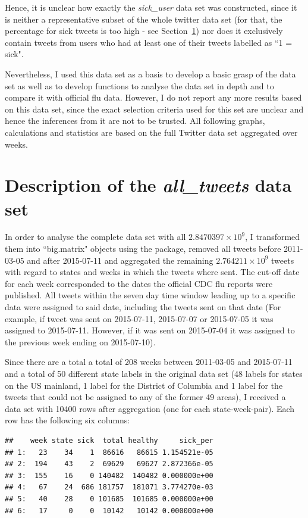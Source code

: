 \documentclass[11pt, a4paper,twoside]{report}\usepackage[]{graphicx}\usepackage[]{color}
\makeatletter
\newenvironment{kframe}{%
 \def\at@end@of@kframe{}%
 \ifinner\ifhmode%
  \def\at@end@of@kframe{\end{minipage}}%
  \begin{minipage}{\columnwidth}%
 \fi\fi%
 \def\FrameCommand##1{\hskip\@totalleftmargin \hskip-\fboxsep
 \colorbox{shadecolor}{##1}\hskip-\fboxsep
     \hskip-\linewidth \hskip-\@totalleftmargin \hskip\columnwidth}%
 \MakeFramed {\advance\hsize-\width
   \@totalleftmargin\z@ \linewidth\hsize
   \@setminipage}}%
 {\par\unskip\endMakeFramed%
 \at@end@of@kframe}
\newenvironment{knitrout}{}{} %
\makeatother
\begin{document}
Hence, it is unclear how exactly the \textit{sick\_user} data set was constructed, since it is neither a representative subset of the whole twitter data set (for that, the percentage for sick tweets is too high - see Section~\ref{sec:full_set}) nor does it exclusively contain tweets from users who had at least one of their tweets labelled as ``1 = sick".

Nevertheless, I used this data set as a basis to develop a basic grasp of the data set as well as to develop functions to analyse the data set in depth and to compare it with official flu data. However, I do not report any more results based on this data set, since the exact selection criteria used for this set are unclear and hence the inferences from it are not to be trusted. All following graphs, calculations and statistics are based on the full Twitter data set aggregated over weeks. 

\section{Description of the \textit{all\_tweets} data set}
\label{sec:full_set}

In order to analyse the complete data set with all \ensuremath{2.8470397\times 10^{9}}, I transformed them into ``big.matrix" objects using the  package, removed all tweets before 2011-03-05 and after 2015-07-11 and aggregated the remaining \ensuremath{2.764211\times 10^{9}} tweets with regard to states and weeks in which the tweets where sent. The cut-off date for each week corresponded to the dates the official CDC flu reports were published. All tweets within the seven day time window leading up to a specific data were assigned to said date, including the tweets sent on that date (For example, if tweet was sent on 2015-07-11, 2015-07-07 or 2015-07-05 it was assigned to 2015-07-11. However, if it was sent on 2015-07-04 it was assigned to the previous week ending on 2015-07-10).\newline

Since there are a total a total of 208 weeks between 2011-03-05 and 2015-07-11 and a total of 50 different state labels in the original data set (48 labels for states on the US mainland, 1 label for the District of Columbia and 1 label for the tweets that could not be assigned to any of the former 49 areas), I received a data set with 10400 rows after aggregation (one for each state-week-pair). Each row has the following six columns:

\begin{knitrout}
\color{fgcolor}\begin{kframe}
\begin{verbatim}
##    week state sick  total healthy     sick_per
## 1:   23    34    1  86616   86615 1.154521e-05
## 2:  194    43    2  69629   69627 2.872366e-05
## 3:  155    16    0 140482  140482 0.000000e+00
## 4:   67    24  686 181757  181071 3.774270e-03
## 5:   40    28    0 101685  101685 0.000000e+00
## 6:   17     0    0  10142   10142 0.000000e+00
\end{verbatim}
\end{kframe}
\end{knitrout}
\end{document}

